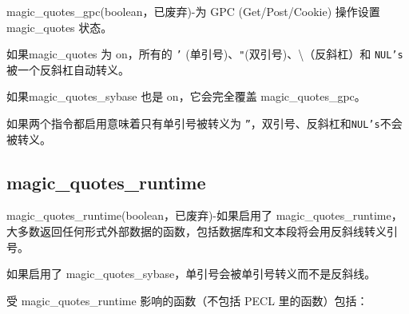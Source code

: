 magic\_quotes\_gpc(boolean，已废弃)-为 GPC (Get/Post/Cookie) 操作设置 magic\_quotes 状态。


\begin{compactitem}
\item 如果magic\_quotes 为 on，所有的 \texttt{'} (单引号)、\texttt{"}(双引号)、\textbackslash （反斜杠）和 \texttt{NUL's}被一个反斜杠自动转义。
\item 如果magic\_quotes\_sybase 也是 on，它会完全覆盖 magic\_quotes\_gpc。
\item 如果两个指令都启用意味着只有单引号被转义为 \texttt{''}，双引号、反斜杠和\texttt{NUL's}不会被转义。
\end{compactitem}

\subsection{magic\_quotes\_runtime}

magic\_quotes\_runtime(boolean，已废弃)-如果启用了 magic\_quotes\_runtime，大多数返回任何形式外部数据的函数，包括数据库和文本段将会用反斜线转义引号。

如果启用了 magic\_quotes\_sybase，单引号会被单引号转义而不是反斜线。


受 magic\_quotes\_runtime 影响的函数（不包括 PECL 里的函数）包括：

